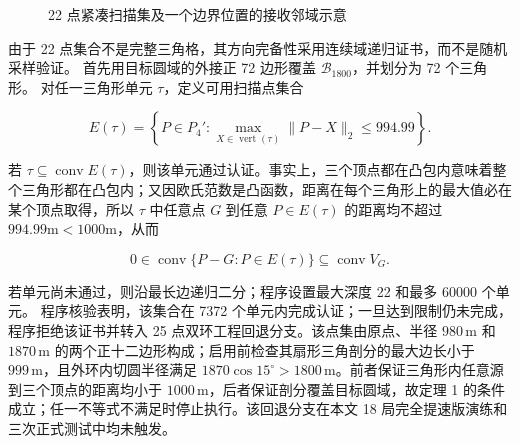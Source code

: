 \begin{figure}[htbp]
\centering
{}
\caption{22 点紧凑扫描集及一个边界位置的接收邻域示意}
\label{fig:q4_compact_sites}
\end{figure}

由于 22 点集合不是完整三角格，其方向完备性采用连续域递归证书，而不是随机采样验证。
首先用目标圆域的外接正 72 边形覆盖 $\mathcal B_{1800}$，并划分为 72 个三角形。
对任一三角形单元 $\tau$，定义可用扫描点集合

\begin{equation}
E(\tau)=
\left\{
P\in P_4':
\max_{X\in\operatorname{vert}(\tau)}
\lVert P-X\rVert_2\le994.99
\right\}.
\label{eq:q4_eligible_set}
\end{equation}

若 $\tau\subseteq\operatorname{conv}E(\tau)$，则该单元通过认证。事实上，三个顶点都在凸包内意味着整个三角形都在凸包内；又因欧氏范数是凸函数，距离在每个三角形上的最大值必在某个顶点取得，所以 $\tau$ 中任意点 $G$ 到任意 $P\in E(\tau)$ 的距离均不超过 $994.99\mathrm{m}<1000\mathrm{m}$，从而

\begin{equation}
0\in\operatorname{conv}\{P-G:P\in E(\tau)\}\subseteq\operatorname{conv}V_G.
\label{eq:q4_cell_certificate}
\end{equation}

若单元尚未通过，则沿最长边递归二分；程序设置最大深度 22 和最多 60000 个单元。
程序核验表明，该集合在 7372 个单元内完成认证；一旦达到限制仍未完成，程序拒绝该证书并转入 25 点双环工程回退分支。该点集由原点、半径 $980\,\mathrm m$ 和 $1870\,\mathrm m$ 的两个正十二边形构成；启用前检查其扇形三角剖分的最大边长小于 $999\,\mathrm m$，且外环内切圆半径满足 $1870\cos15^\circ>1800\,\mathrm m$。前者保证三角形内任意源到三个顶点的距离均小于 $1000\,\mathrm m$，后者保证剖分覆盖目标圆域，故定理 1 的条件成立；任一不等式不满足时停止执行。该回退分支在本文 18 局完全提速版演练和三次正式测试中均未触发。

